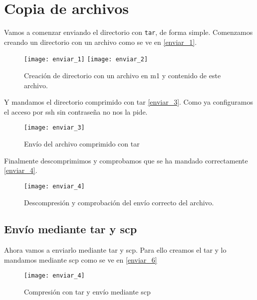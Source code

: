


\chapter{Copia de archivos}

Vamos a comenzar enviando el directorio con \verb|tar|, de forma simple. Comenzamos creando un directorio con un archivo como se ve en \eqref{enviar_1}.

\begin{figure}[h!]
\begin{center}
\caption{Creación de directorio con un archivo en m1 y contenido de este archivo.}
\label{enviar_1}
\texttt{[image: enviar\_1]}
\texttt{[image: enviar\_2]}
\end{center}
\end{figure}

Y mandamos el directorio comprimido con tar \eqref{enviar_3}. Como ya configuramos el acceso por ssh sin contraseña no nos la pide.

\begin{figure}[h!]
\begin{center}
\caption{Envío del archivo comprimido con tar}
\label{enviar_3}
\texttt{[image: enviar\_3]}
\end{center}
\end{figure}

Finalmente descomprimimos y comprobamos que se ha mandado correctamente \eqref{enviar_4}.

\begin{figure}[h!]
\begin{center}
\caption{Descompresión y comprobación del envío correcto del archivo.}
\label{enviar_4}
\texttt{[image: enviar\_4]}
\end{center}
\end{figure}

\section{Envío mediante tar y scp}

Ahora vamos a enviarlo mediante tar y scp. Para ello creamos el tar y lo mandamos mediante scp como se ve en \eqref{enviar_6}

\begin{figure}[h!]
\begin{center}
\caption{Compresión con tar y envío mediante scp}
\label{enviar_6}
\texttt{[image: enviar\_4]}
\end{center}
\end{figure}

